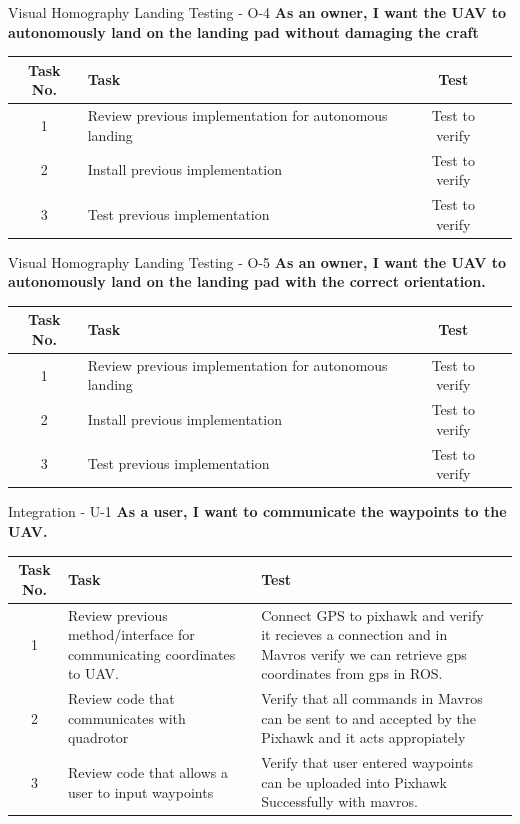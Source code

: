 \documentclass[11pt]{beamer}
\begin{document}
\begin{frame}{Visual Homography Landing Testing - O-4}
	\textbf{As an owner, I want the UAV to autonomously land on the landing pad without damaging the craft}
	\begin{tabular}{| c | >{\raggedright}m{4cm} | c | c |}\hline
		Task No. & Task & Test \\\hline
		1 & Review previous implementation for autonomous landing & Test to verify\\\hline
		2 & Install previous implementation & Test to verify\\\hline
		3 & Test previous implementation & Test to verify\\\hline
		
	\end{tabular}
\end{frame}
\begin{frame}{Visual Homography Landing Testing - O-5}
\textbf{As an owner, I want the UAV to autonomously land on the landing pad with the correct orientation.}
\begin{tabular}{| c | >{\raggedright}m{4cm} | c | c |}\hline
	Task No. & Task & Test\\\hline
	1 & Review previous implementation for autonomous landing & Test to verify\\\hline
	2 & Install previous implementation & Test to verify\\\hline
	3 & Test previous implementation & Test to verify\\\hline
\end{tabular}
\end{frame}

\begin{frame}{Integration - U-1}
\textbf{As a user, I want to communicate the waypoints to the UAV.}
\begin{tabular}{| c | >{\raggedright}m{4cm} | m{4cm} | c |}\hline
	Task No. & Task & Test\\\hline
	1 & Review previous method/interface for communicating coordinates to UAV. & Connect GPS to pixhawk and verify it recieves a connection and in Mavros verify we can retrieve gps coordinates from gps in ROS.  \\\hline
	2 & Review code that communicates with quadrotor & Verify that all commands in Mavros can be sent to and accepted by the Pixhawk and it acts appropiately \\\hline
	3 & Review code that allows a user to input waypoints & Verify that user entered waypoints can be uploaded into Pixhawk Successfully with mavros.\\\hline
	
\end{tabular}
\end{frame}
\end{document}
